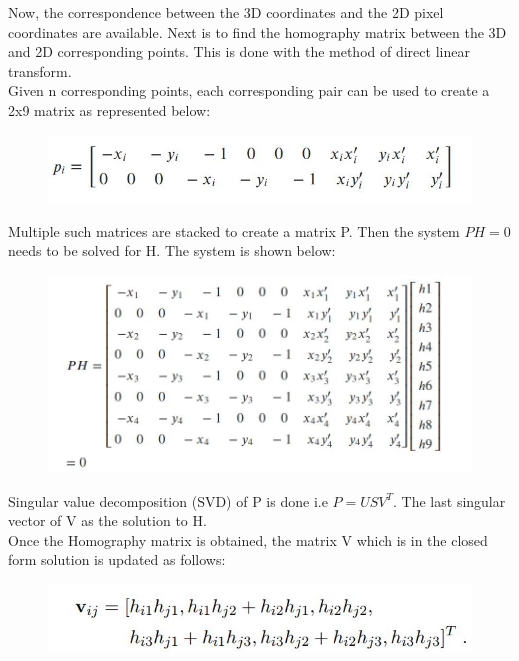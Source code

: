 \documentclass[conference]{IEEEtran}
\begin{document}
Now, the correspondence between the 3D coordinates and the 2D pixel coordinates are available. Next is to find the homography matrix between the 3D and 2D corresponding points. This is done with the method of direct linear transform. \\

Given n corresponding points, each corresponding pair can be used to create a 2x9 matrix as represented below:

\begin{figure}[H]
\centering
\includegraphics[scale = 0.35]{2.jpg}
\label{fig_sim}
\end{figure}

Multiple such matrices are stacked to create a matrix P. Then the system $PH = 0$ needs to be solved for H. The system is shown below:

\begin{figure}[H]
\centering
\includegraphics[scale = 0.35]{3.jpg}
\label{fig_sim}
\end{figure}

Singular value decomposition (SVD) of P is done i.e $P = USV^T$. The  last singular vector of V as the solution to H.\\

Once the Homography matrix is obtained, the matrix V which is in the closed form solution  is updated as follows:

\begin{figure}[H]
\centering
\includegraphics[scale = 0.35]{4.jpg}
\label{fig_sim}
\end{figure}
\end{document}
